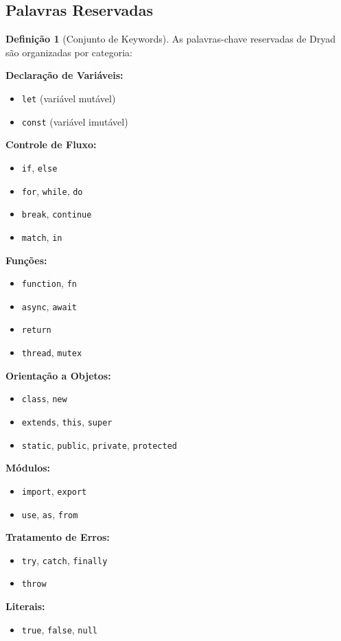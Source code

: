\documentclass[12pt,a4paper]{article}
\theoremstyle{definition}
\newtheorem{definition}{Definição}[section]
\begin{document}
\subsection{Palavras Reservadas}

\begin{definition}[Conjunto de Keywords]
As palavras-chave reservadas de Dryad são organizadas por categoria:

\textbf{Declaração de Variáveis:}
\begin{itemize}[noitemsep]
    \item \texttt{let} (variável mutável)
    \item \texttt{const} (variável imutável)
\end{itemize}

\textbf{Controle de Fluxo:}
\begin{itemize}[noitemsep]
    \item \texttt{if}, \texttt{else}
    \item \texttt{for}, \texttt{while}, \texttt{do}
    \item \texttt{break}, \texttt{continue}
    \item \texttt{match}, \texttt{in}
\end{itemize}

\textbf{Funções:}
\begin{itemize}[noitemsep]
    \item \texttt{function}, \texttt{fn}
    \item \texttt{async}, \texttt{await}
    \item \texttt{return}
    \item \texttt{thread}, \texttt{mutex}
\end{itemize}

\textbf{Orientação a Objetos:}
\begin{itemize}[noitemsep]
    \item \texttt{class}, \texttt{new}
    \item \texttt{extends}, \texttt{this}, \texttt{super}
    \item \texttt{static}, \texttt{public}, \texttt{private}, \texttt{protected}
\end{itemize}

\textbf{Módulos:}
\begin{itemize}[noitemsep]
    \item \texttt{import}, \texttt{export}
    \item \texttt{use}, \texttt{as}, \texttt{from}
\end{itemize}

\textbf{Tratamento de Erros:}
\begin{itemize}[noitemsep]
    \item \texttt{try}, \texttt{catch}, \texttt{finally}
    \item \texttt{throw}
\end{itemize}

\textbf{Literais:}
\begin{itemize}[noitemsep]
    \item \texttt{true}, \texttt{false}, \texttt{null}
\end{itemize}
\end{definition}
\end{document}
